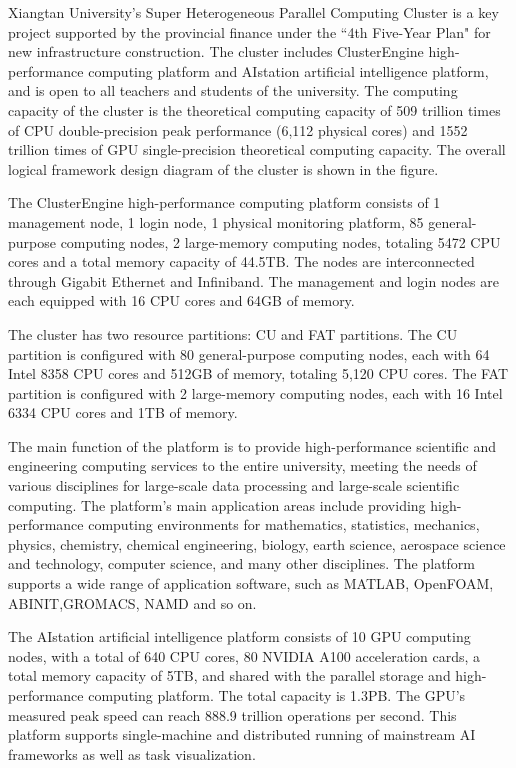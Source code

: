 

Xiangtan University's Super Heterogeneous Parallel Computing Cluster is a key project supported by the provincial finance under the ``4th Five-Year Plan" for new infrastructure construction. 
The cluster includes ClusterEngine high-performance computing platform and AIstation artificial intelligence platform, and is open to all teachers and students of the university. 
The computing capacity of the cluster is the theoretical computing capacity of 509 trillion times of CPU double-precision peak performance (6,112 physical cores) and 1552 trillion times of GPU single-precision theoretical computing capacity.
The overall logical framework design diagram of the cluster is shown in the figure.

The ClusterEngine high-performance computing platform consists of 1 management node, 1 login node, 1 physical monitoring platform, 85 general-purpose computing nodes, 2 large-memory computing nodes, totaling 5472 CPU cores and a total memory capacity of 44.5TB. 
The nodes are interconnected through Gigabit Ethernet and Infiniband.
The management and login nodes are each equipped with 16 CPU cores and 64GB of memory.

The cluster has two resource partitions: CU and FAT partitions. 
The CU partition is configured with 80 general-purpose computing nodes, each with 64 Intel 8358 CPU cores and 512GB of memory, totaling 5,120 CPU cores. 
The FAT partition is configured with 2 large-memory computing nodes, each with 16 Intel 6334 CPU cores and 1TB of memory. 


The main function of the platform is to provide high-performance scientific and engineering computing services to the entire university, meeting the needs of various disciplines for large-scale data processing and large-scale scientific computing. 
The platform's main application areas include providing high-performance computing environments for mathematics, statistics, mechanics, physics, chemistry, chemical engineering, biology, earth science, aerospace science and technology, computer science, and many other disciplines.
The platform supports a wide range of application software, such as MATLAB, OpenFOAM, ABINIT,GROMACS, NAMD and so on.

The AIstation artificial intelligence platform consists of 10 GPU computing nodes, with a total of 640 CPU cores, 80 NVIDIA A100 acceleration cards, a total memory capacity of 5TB, and shared with the parallel storage and high-performance computing platform. 
The total capacity is 1.3PB. 
The GPU's measured peak speed can reach 888.9 trillion operations per second. 
This platform supports single-machine and distributed running of mainstream AI frameworks as well as task visualization.

